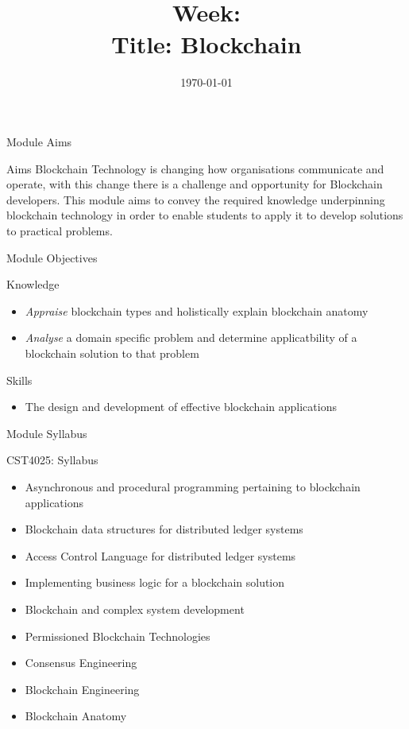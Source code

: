 \documentclass[pdf,table]{beamer}
\title[\moduleCode:L\theweek]{\moduleTitle \\ Week: \theweek \\ Title: Blockchain}
\institute[]{\texttt{[image: ../../../logo/mdxSmall]} \\ Middlesex University, \\Dept. of Computer Science, \\London}
\author[\email]{\moduleLeader}
\date{\today}
\begin{document}
	\begin{frame}
		\titlepage
	\end{frame}



	\begin{frame}{Module Aims}
		\begin{block}{Aims}
	Blockchain Technology is changing how organisations communicate and operate, with this change there is a challenge and opportunity for Blockchain developers. This module aims to convey the required knowledge underpinning blockchain technology in order to enable students to apply it to develop solutions to practical problems.		
		\end{block}
	\end{frame}

	\begin{frame}{Module Objectives}
		\begin{block}{Knowledge}
			\begin{itemize}
				\item {\it Appraise} blockchain types and holistically explain blockchain anatomy
				\item {\it Analyse} a domain specific problem and determine applicatbility of a blockchain solution to that problem
			\end{itemize}	
		\end{block}
		\begin{block}{Skills}
			\begin{itemize}
				\item The design and development of effective blockchain applications
			\end{itemize}
		\end{block}
	\end{frame}


\begin{frame}{Module Syllabus}
	\begin{block}{CST4025: Syllabus}
	\begin{itemize}
		\item  Asynchronous and procedural programming pertaining to blockchain applications
	    	\item  Blockchain data structures for distributed ledger systems
	    	\item  Access Control Language for distributed ledger systems
	    	\item  Implementing business logic for a blockchain solution 
	    	\item  Blockchain and complex system development
	    	\item  Permissioned Blockchain Technologies
	    	\item  Consensus Engineering
	    	\item  Blockchain Engineering
	    	\item  Blockchain Anatomy
	\end{itemize}
	\end{block}
\end{frame}
\end{document}
